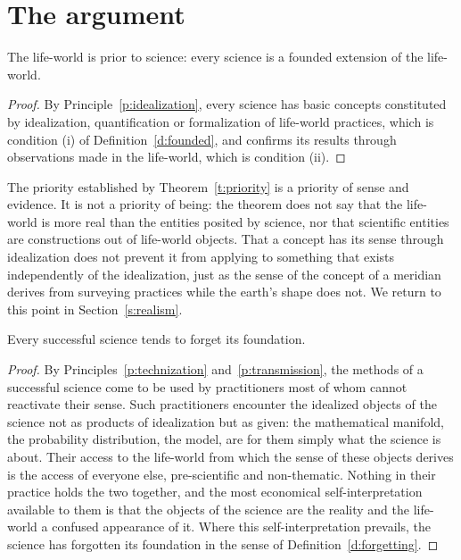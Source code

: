 \documentclass{situationist-preprint}
\begin{document}
\section{The argument}\label{s:argument}

\begin{theorem}\label{t:priority}
The life-world is prior to science: every science is a founded extension of the life-world.
\end{theorem}

\begin{proof}
By Principle~\ref{p:idealization}, every science has basic concepts constituted by idealization, quantification or formalization of life-world practices, which is condition (i) of Definition~\ref{d:founded}, and confirms its results through observations made in the life-world, which is condition (ii).
\end{proof}

The priority established by Theorem~\ref{t:priority} is a priority of sense and evidence. It is not a priority of being: the theorem does not say that the life-world is more real than the entities posited by science, nor that scientific entities are constructions out of life-world objects. That a concept has its sense through idealization does not prevent it from applying to something that exists independently of the idealization, just as the sense of the concept of a meridian derives from surveying practices while the earth's shape does not. We return to this point in Section~\ref{s:realism}.

\begin{proposition}\label{p:tendency}
Every successful science tends to forget its foundation.
\end{proposition}

\begin{proof}
By Principles~\ref{p:technization} and~\ref{p:transmission}, the methods of a successful science come to be used by practitioners most of whom cannot reactivate their sense. Such practitioners encounter the idealized objects of the science not as products of idealization but as given: the mathematical manifold, the probability distribution, the model, are for them simply what the science is about. Their access to the life-world from which the sense of these objects derives is the access of everyone else, pre-scientific and non-thematic. Nothing in their practice holds the two together, and the most economical self-interpretation available to them is that the objects of the science are the reality and the life-world a confused appearance of it. Where this self-interpretation prevails, the science has forgotten its foundation in the sense of Definition~\ref{d:forgetting}.
\end{proof}
\end{document}
